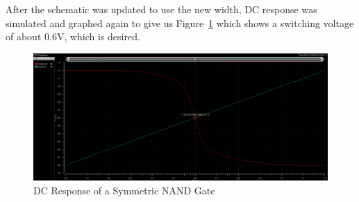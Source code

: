 \documentclass[12pt]{article}
\begin{document}
After the schematic was updated to use the new width, DC response was simulated and graphed again to give us Figure~\ref{fig:nand_dc_symm} which shows a switching voltage
of about 0.6V, which is desired.
\begin{figure}[!htb]
  \centering
  \includegraphics[width=5in]{figures/nand/nand_dc_symm.png}
  \caption{DC Response of a Symmetric NAND Gate}\label{fig:nand_dc_symm}
\end{figure}
\end{document}
